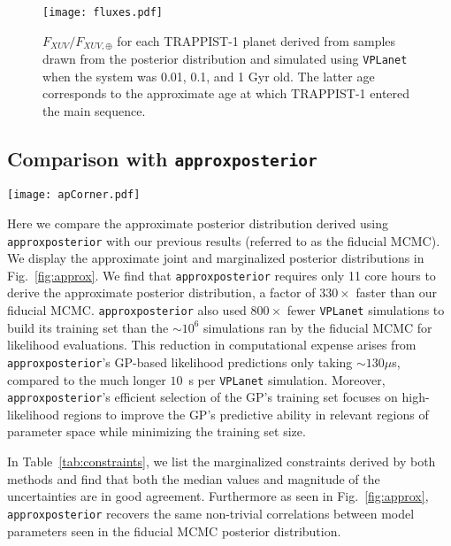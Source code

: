 \documentclass[twocolumn]{aastex62}
\newcommand{\vplanet}[0]{\texttt{VPLanet}\xspace}
\newcommand{\approxposterior}[0]{\texttt{approxposterior}\xspace}
\begin{document}
\begin{figure}
	\texttt{[image: fluxes.pdf]}
   \caption{$F_{XUV}/F_{XUV,\oplus}$ for each TRAPPIST-1 planet derived from samples drawn from the posterior distribution and simulated using \vplanet when the system was 0.01, 0.1, and 1 Gyr old. The latter age corresponds to the approximate age at which TRAPPIST-1 entered the main sequence.}%
    \label{fig:fluxes}%
\end{figure}


\subsection{Comparison with \approxposterior} \label{sec:approx}


\begin{figure*}[t]
\centering
	\texttt{[image: apCorner.pdf]}
   \caption{Same format as Fig.~\ref{fig:corner}, but derived by \approxposterior.}%
    \label{fig:approx}%
\end{figure*}

Here we compare the approximate posterior distribution derived using \approxposterior with our previous results (referred to as the fiducial MCMC). We display the approximate joint and marginalized posterior distributions in Fig.~\ref{fig:approx}. We find that \approxposterior requires only 11 core hours to derive the approximate posterior distribution, a factor of $330\times$ faster than our fiducial MCMC. \approxposterior also used $800\times$ fewer \vplanet simulations to build its training set than the ${\sim}10^6$ simulations ran by the fiducial MCMC for likelihood evaluations. This reduction in computational expense arises from \approxposterior's GP-based likelihood predictions only taking ${\sim}130\mu$s, compared to the much longer $10$~s per \vplanet simulation. Moreover, \approxposterior's efficient selection of the GP's training set focuses on high-likelihood regions to improve the GP's predictive ability in relevant regions of parameter space while minimizing the training set size. 

In Table~\ref{tab:constraints}, we list the marginalized constraints derived by both methods and find that both the median values and magnitude of the uncertainties are in good agreement. Furthermore as seen in Fig.~\ref{fig:approx}, \approxposterior recovers the same non-trivial correlations between model parameters seen in the fiducial MCMC posterior distribution. 
\end{document}
